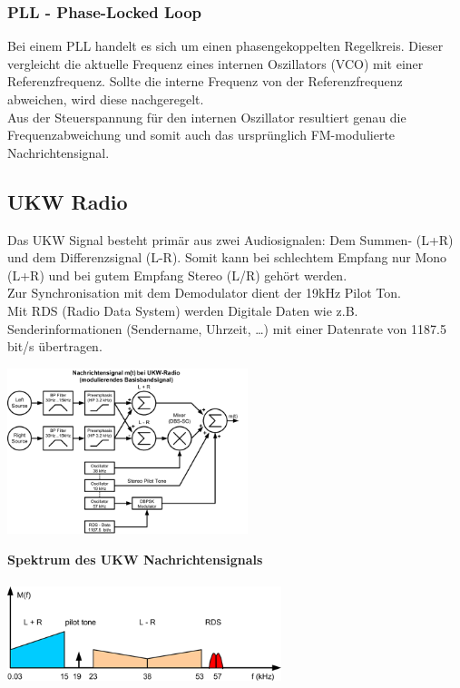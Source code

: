 \subsubsection{PLL - Phase-Locked Loop}
Bei einem PLL handelt es sich um einen phasengekoppelten Regelkreis. Dieser vergleicht die
aktuelle Frequenz eines internen Oszillators (VCO) mit einer Referenzfrequenz. Sollte die
interne Frequenz von der Referenzfrequenz abweichen, wird diese nachgeregelt. \\
Aus der Steuerspannung für den internen Oszillator resultiert genau die Frequenzabweichung und
somit auch das ursprünglich FM-modulierte Nachrichtensignal.\\


\subsection{UKW Radio}
Das UKW Signal besteht primär aus zwei Audiosignalen: Dem Summen- (L+R) und dem Differenzsignal (L-R).
Somit kann bei schlechtem Empfang nur Mono (L+R) und bei gutem Empfang Stereo (L/R) gehört werden. \\
Zur Synchronisation mit dem Demodulator dient der 19kHz Pilot Ton. \\
Mit RDS (Radio Data System) werden Digitale Daten wie z.B. Senderinformationen (Sendername, Uhrzeit,
\ldots) mit einer Datenrate von 1187.5 bit/s übertragen. \\
\begin{minipage}{9cm}
	\includegraphics[width=7cm]{bilder/ukw_blockdiagramm.png}
\end{minipage}
\begin{minipage}{9cm} 
	\textbf{Spektrum des UKW Nachrichtensignals} \\ \\
    \includegraphics[width=8cm]{bilder/ukw_spektrum.png}
\end{minipage}
